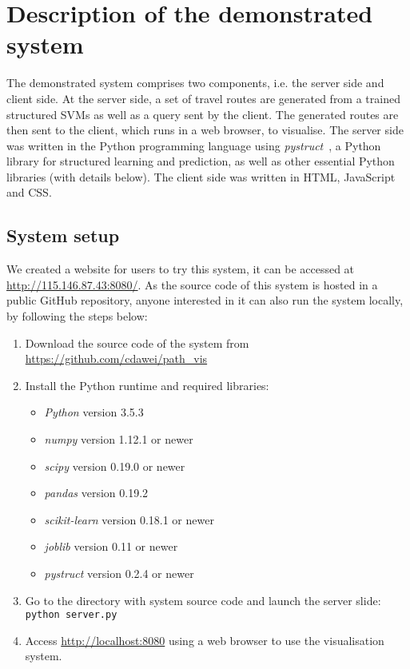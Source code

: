 \clearpage
\appendix
\onecolumn

\section{Description of the demonstrated system}
\label{sec:desc-sup}
The demonstrated system comprises two components, i.e. the server side and client side.
At the server side, a set of travel routes are generated from a trained structured SVMs as well as 
a query sent by the client. 
The generated routes are then sent to the client, which runs in a web browser, to visualise.
The server side was written in the Python programming language using \textit{pystruct}~\cite{JMLR:v15:mueller14a},
a Python library for structured learning and prediction,
as well as other essential Python libraries (with details below).
The client side was written in HTML, JavaScript and CSS.


\subsection{System setup}
\label{ssec:setup}
We created a website for users to try this system, it can be accessed at \url{http://115.146.87.43:8080/}.
As the source code of this system is hosted in a public GitHub repository, 
anyone interested in it can also run the system locally, by following the steps below:
\begin{enumerate}
\item Download the source code of the system from \url{https://github.com/cdawei/path_vis} 
\item Install the Python runtime and required libraries: 
      \begin{itemize}
      \item \textit{Python} version 3.5.3
      \item \textit{numpy} version 1.12.1 or newer
      \item \textit{scipy} version 0.19.0 or newer
      \item \textit{pandas} version 0.19.2
      \item \textit{scikit-learn} version 0.18.1 or newer
      \item \textit{joblib} version 0.11 or newer
      \item \textit{pystruct} version 0.2.4 or newer
      \end{itemize}
\item Go to the directory with system source code and launch the server slide: \texttt{python server.py}
\item Access \url{http://localhost:8080} using a web browser to use the visualisation system.
\end{enumerate}


